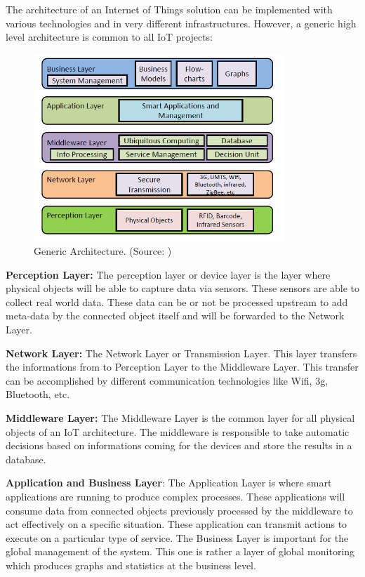 \documentclass[11pt]{article}
\begin{document}
The architecture of an Internet of Things solution can be implemented with various technologies and in very different infrastructures. However, a generic high level architecture is common to all IoT projects:
\begin{figure}[H]
	\includegraphics[width=\textwidth,height=200pt]{assets/Abstract_IoT_Architecture.png} 
	\caption[Generic Architecture]{Generic Architecture. (Source: \cite{Future-Internet-The-Internet-of-Things})}
	\label{fig:genericArchitecture}
\end{figure}

\textbf{Perception Layer:} The perception layer or device layer is the layer where physical objects will be able to capture data via sensors. These sensors are able to collect real world data. These data can be or not be processed upstream to add meta-data by the connected object itself and will be forwarded to the Network Layer.

\textbf{Network Layer:} The Network Layer or Transmission Layer. This layer transfers the informations from to Perception Layer to the Middleware Layer. This transfer can be accomplished by different communication technologies like Wifi, 3g, Bluetooth, etc.

\textbf{Middleware Layer:} The Middleware Layer is the common layer for all physical objects of an IoT architecture. The middleware is responsible to take automatic decisions based on informations coming for the devices and store the results in a database. 

\textbf{Application and Business Layer}: The Application Layer is where smart applications are running to produce complex processes. These applications will consume data from connected objects previously processed by the middleware to act effectively on a specific situation. These application can transmit actions to execute on a particular type of service. The Business Layer is important for the global management of the system. This one is rather a layer of global monitoring which produces graphs and statistics at the business level.
\end{document}
